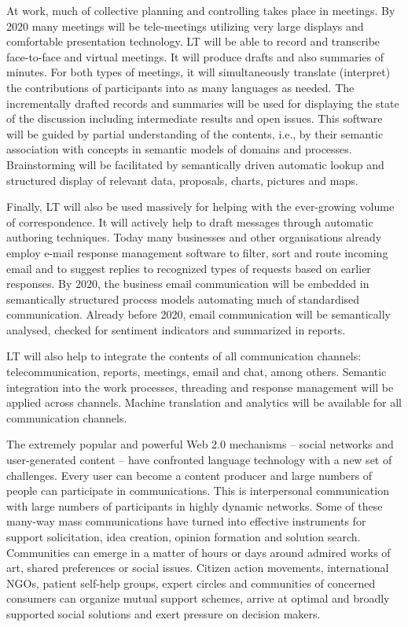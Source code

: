 \documentclass[10pt, plain]{../../metanetpaper}
\begin{document}
\begin{multicols}{2}
At work, much of collective planning and controlling takes place in meetings. By 2020 many meetings will be tele-meetings utilizing very large displays and comfortable presentation technology. LT will be able to record and transcribe face-to-face and virtual meetings. It will produce drafts and also summaries of minutes. For both types of meetings, it will simultaneously translate (interpret) the contributions of participants into as many languages as needed. The incrementally drafted records and summaries will be used for displaying the state of the discussion including intermediate results and open issues. This software will be guided by partial understanding of the contents, i.e., by their semantic association with concepts in semantic models of domains and processes. Brainstorming will be facilitated by semantically driven automatic lookup and structured display of relevant data, proposals, charts, pictures and maps.
 
Finally, LT will also be used massively for helping with the ever-growing volume of correspondence. It will actively help to draft messages through automatic authoring techniques. Today many businesses and other organisations already employ e-mail response management software to filter, sort and route incoming email and to suggest replies to recognized types of requests based on earlier responses. By 2020, the business email communication will be embedded in semantically structured process models automating much of standardised communication. Already before 2020, email communication will be semantically analysed, checked for sentiment indicators and summarized in reports.
 
LT will also help to integrate the contents of all communication channels: telecommunication, reports, meetings, email and chat, among others. Semantic integration into the work processes, threading and response management will be applied across channels. Machine translation and analytics will be available for all communication channels.
 
The extremely popular and powerful Web 2.0 mechanisms – social networks and user-generated content – have confronted language technology with a new set of challenges. Every user can become a content producer and large numbers of people can participate in communications. This is interpersonal communication with large numbers of participants in highly dynamic networks. Some of these many-way mass communications have turned into effective instruments for support solicitation, idea creation, opinion formation and solution search. Communities can emerge in a matter of hours or days around admired works of art, shared preferences or social issues. Citizen action movements, international NGOs, patient self-help groups, expert circles and communities of concerned consumers can organize mutual support schemes, arrive at optimal and broadly supported social solutions and exert pressure on decision makers.
 

\end{multicols}
\end{document}
